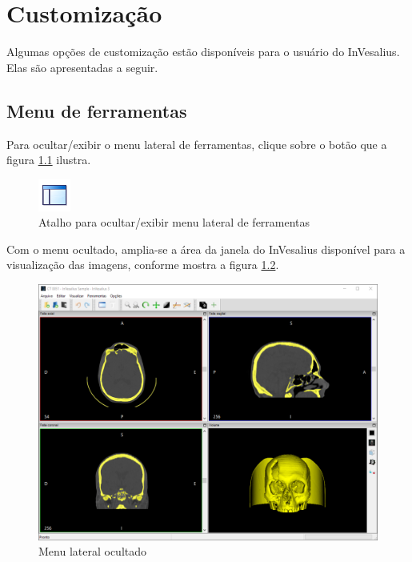 \chapter{Customização}

Algumas opções de customização estão disponíveis para o usuário do InVesalius. Elas
são apresentadas a seguir.

\section{Menu de ferramentas}

Para ocultar/exibir o menu lateral de ferramentas, clique sobre o botão que a figura
\ref{fig:layout_full_original} ilustra.

\begin{figure}[!htb]
\centering
\includegraphics[scale=0.5]{../user_guide_figures/icons/layout_full_original.png}
\caption{Atalho para ocultar/exibir menu lateral de ferramentas}
\label{fig:layout_full_original}
\end{figure}

Com o menu ocultado, amplia-se a área da janela do InVesalius disponível para a
visualização das imagens, conforme mostra a figura \ref{fig:closed_tool_menu}.

\begin{figure}[!htb]
\centering
\includegraphics[scale=0.4]{../user_guide_figures/invesalius_screen/window_mpr_not_painels_pt.png}
\caption{Menu lateral ocultado}
\label{fig:closed_tool_menu}
\end{figure}

